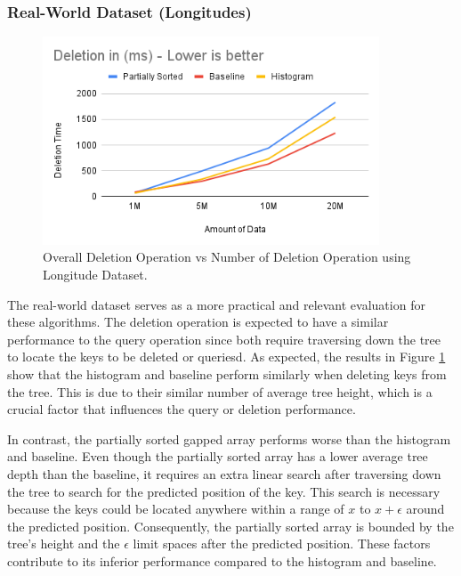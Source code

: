 \subsubsection{Real-World Dataset (Longitudes)}
\begin{figure}[H]
    \centering
    \includegraphics[width=100mm,scale=1]{Figures/DeleteLongitude.png}
    \caption{
    Overall Deletion Operation vs Number of Deletion Operation using Longitude Dataset.
    }
    \label{fig:DeleteLongitude}
\end{figure}
The real-world dataset serves as a more practical and relevant evaluation for these algorithms. The deletion operation is expected to have a similar performance to the query operation since both require traversing down the tree to locate the keys to be deleted or queriesd. As expected, the results in Figure \ref{fig:DeleteLongitude} show that the histogram and baseline perform similarly when deleting keys from the tree. This is due to their similar number of average tree height, which is a crucial factor that influences the query or deletion performance.

In contrast, the partially sorted gapped array performs worse than the histogram and baseline. Even though the partially sorted array has a lower average tree depth than the baseline, it requires an extra linear search after traversing down the tree to search for the predicted position of the key. This search is necessary because the keys could be located anywhere within a range of $x$ to $x + \epsilon$ around the predicted position. Consequently, the partially sorted array is bounded by the tree's height and the $\epsilon$ limit spaces after the predicted position. These factors contribute to its inferior performance compared to the histogram and baseline.


